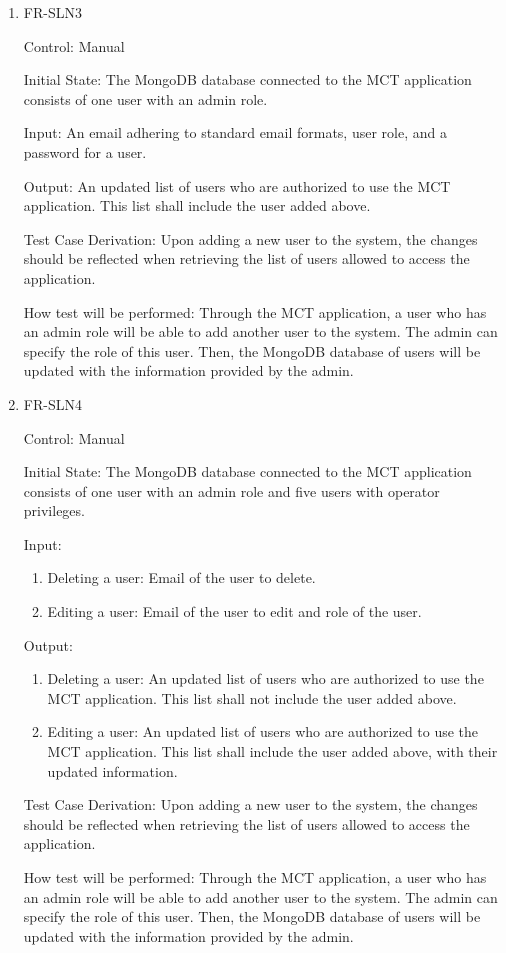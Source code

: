 \documentclass[12pt, titlepage]{article}
\begin{document}
\begin{enumerate}

\item{FR-SLN3\\}

Control: Manual
					
Initial State: The MongoDB database connected to the MCT application consists of one user with an admin role.
					
Input: An email adhering to standard email formats, user role, and a password for a user.
					
Output: An updated list of users who are authorized to use the MCT application. This list shall include the user added above.

Test Case Derivation: Upon adding a new user to the system, the changes should be reflected when retrieving the list of users allowed to access the application.
					
How test will be performed: 
Through the MCT application, a user who has an admin role will be able to add another user to the system. The admin can specify the role of this user. Then, the MongoDB database of users will be updated with the information provided by the admin.

\item{FR-SLN4\\}

Control: Manual
					
Initial State: The MongoDB database connected to the MCT application consists of one user with an admin role and five users with operator privileges.
					
Input: 
\begin{enumerate}
    \item Deleting a user: Email of the user to delete.
    \item Editing a user: Email of the user to edit and role of the user.
\end{enumerate}
					
Output: 
\begin{enumerate}
    \item Deleting a user: An updated list of users who are authorized to use the MCT application. This list shall not include the user added above.
    \item Editing a user: An updated list of users who are authorized to use the MCT application. This list shall include the user added above, with their updated information.
\end{enumerate}
Test Case Derivation: Upon adding a new user to the system, the changes should be reflected when retrieving the list of users allowed to access the application.
					
How test will be performed: 
Through the MCT application, a user who has an admin role will be able to add another user to the system. The admin can specify the role of this user. Then, the MongoDB database of users will be updated with the information provided by the admin.

\end{enumerate}
\end{document}
